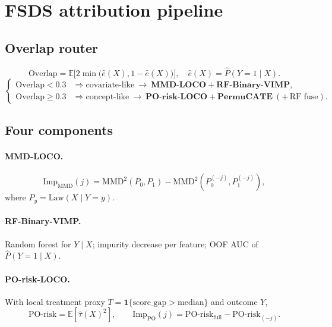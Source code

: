\documentclass[11pt]{article}
\newcommand{\ind}{\mathbf{1}}
\newcommand{\E}{\mathbb{E}}
\newcommand{\Phat}{\widehat{P}}
\begin{document}
\section{FSDS attribution pipeline}
\label{sec:fsds}

\subsection{Overlap router}
\begin{equation}
  \mathrm{Overlap}
  =\E\bigl[2\min\bigl(\hat e(X),1-\hat e(X)\bigr)\bigr],
  \quad
  \hat e(X)=\Phat(Y{=}1\mid X).
\end{equation}
\begin{equation}
  \begin{cases}
    \mathrm{Overlap}<0.3 &\Rightarrow
      \text{covariate-like}\ \to\
      \textbf{MMD-LOCO}+\textbf{RF-Binary-VIMP},\\[0.2em]
    \mathrm{Overlap}\ge 0.3 &\Rightarrow
      \text{concept-like}\ \to\
      \textbf{PO-risk-LOCO}+\textbf{PermuCATE}\ (+\,\text{RF fuse}).
  \end{cases}
  \label{eq:router}
\end{equation}

\subsection{Four components}

\paragraph{MMD-LOCO.}
\[
  \mathrm{Imp}_{\mathrm{MMD}}(j)
  =\mathrm{MMD}^2(P_0,P_1)
   -\mathrm{MMD}^2(P_0^{(-j)},P_1^{(-j)}),
\]
where $P_y=\mathrm{Law}(X\mid Y{=}y)$.

\paragraph{RF-Binary-VIMP.}
Random forest for $Y\mid X$; impurity decrease per feature; OOF AUC of
$\Phat(Y{=}1\mid X)$.

\paragraph{PO-risk-LOCO.}
With local treatment proxy $T=\ind\{\mathrm{score\_gap}>\mathrm{median}\}$
and outcome $Y$,
\[
  \mathrm{PO\text{-}risk}=\E[\hat\tau(X)^2],
  \qquad
  \mathrm{Imp}_{\mathrm{PO}}(j)
  =\mathrm{PO\text{-}risk}_{\mathrm{full}}
   -\mathrm{PO\text{-}risk}_{(-j)}.
\]
\end{document}

